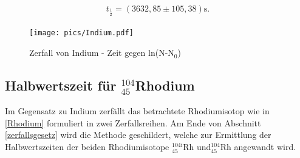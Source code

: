 \begin{align}
 t_{\frac12} = (3632,85 \pm 105,38) \text{s}.
 \label{in}
\end{align}

\begin{figure}[h]
	\texttt{[image: pics/Indium.pdf]}
	\caption{Zerfall von Indium - Zeit gegen ln(N-N$_0$)}
\end{figure}

\subsection{Halbwertszeit für $^{104}_{45}$Rhodium}
Im Gegensatz zu Indium zerfällt das betrachtete Rhodiumisotop wie in \eqref{Rhodium} formuliert in zwei Zerfallsreihen.
Am Ende von Abschnitt \ref{zerfallsgesetz} wird die Methode geschildert, welche zur Ermittlung der Halbwertszeiten der beiden
Rhodiumisotope $^{104\text{i}}_{45}$Rh und$^{104}_{45}$Rh angewandt wird.

